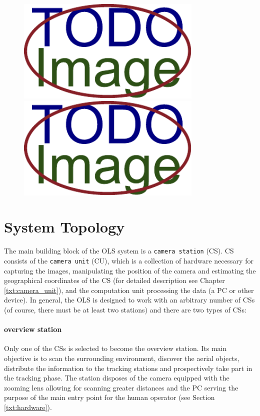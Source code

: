 \begin{figure}[t]\centering %
	\centering
	\includegraphics[width=0.45\linewidth, height=5cm]{fig/placeholder.pdf}
	\includegraphics[width=0.45\linewidth, height=5cm]{fig/placeholder.pdf}
	\caption{}
	\label{fig:WidePicture}
\end{figure}

\vata[4]

\section{System Topology}

The main building block of the OLS system is a \texttt{camera station} (CS). CS consists of the \texttt{camera unit} (CU), which is a collection of hardware necessary for capturing the images, manipulating the position of the camera and estimating the geographical coordinates of the CS (for detailed description see Chapter \ref{txt:camera_unit}), and the computation unit processing the data (a PC or other device). In general, the OLS is designed to work with an arbitrary number of CSs (of course, there must be at least two stations) and there are two types of CSs:

\paragraph{overview station} Only one of the CSs is selected to become the overview station. Its main objective is to scan the surrounding environment, discover the aerial objects, distribute the information to the tracking stations and prospectively take part in the tracking phase. The station disposes of the camera equipped with the zooming lens allowing for scanning greater distances and the PC serving the purpose of the main entry point for the human operator (see Section \ref{txt:hardware}).

